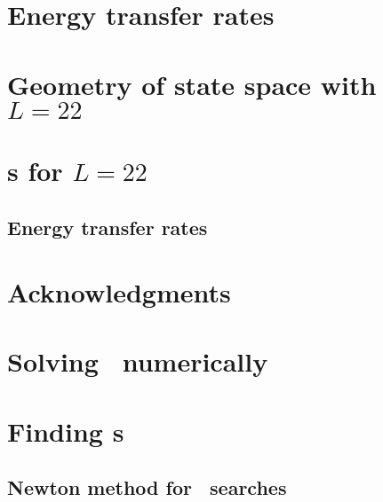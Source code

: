 \documentclass{siamltex}          %
\begin{document}


\section{\KSe}
\label{s-KS}


\section{Energy transfer rates} %
\label{sec:energy}


\section{Geometry of state space with $L=22$}
\label{sec:L22}


\PublicPrivate{%
        }{ %

    } %

\section{\Rpo s for $L=22$}
\label{sec:rpos}


\subsection{Energy transfer rates} %
\label{sec:energyL22}


    \PublicPrivate{%
        }{%

    } %



\section*{Acknowledgments}


\appendix

\section{Solving \KSe\ numerically}
\label{sec:fourierRLD}


\section{Finding \rpo s}
\label{sec:lmderRLD}


\subsection{Newton method  for \rpo\ searches}
\label{sec:NewtRPOs}




\end{document}
